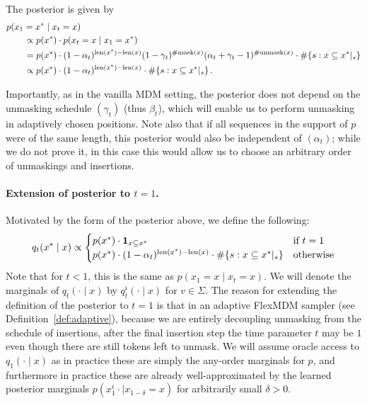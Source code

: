 The posterior is given by
\begin{align*}
    \MoveEqLeft p(x_1 = x^*\mid x_t = x) \\
    &\propto p(x^*) \cdot p(x_t = x \mid x_1 = x^*) \\
    &= p(x^*) \cdot (1 - \alpha_t)^{\length{x^*} - \length{x}} (1 - \gamma_t)^{\#\mathrm{mask}(x)} (\alpha_t + \gamma_t - 1)^{\#\mathrm{unmask}(x)} \cdot \#\{s: x \subseteq x^*|_s\} \\
    &\propto p(x^*) \cdot (1 - \alpha_t)^{\length{x^*}-\length{x}} \cdot \#\{s: x\subseteq x^*|_s\}\,. \label{eq:posterior}
\end{align*}

Importantly, as in the vanilla MDM setting, the posterior does not depend on the unmasking schedule $(\gamma_t)$ (thus $\beta_t$), which will enable us to perform unmasking in adaptively chosen positions. Note also that if all sequences in the support of $p$ were of the same length, this posterior would also be independent of $(\alpha_t)$; while we do not prove it, in this case this would allow us to choose an arbitrary order of unmaskings and insertions.

\paragraph{Extension of posterior to $t = 1$.}

Motivated by the form of the posterior above, we define the following:
\begin{equation}
    q_t(x^* \mid x) \propto \begin{cases}
        p(x^*) \cdot \mathbf{1}_{x\subseteq x^*} & \text{if} \ t = 1 \\
        p(x^*) \cdot (1 - \alpha_t)^{\mathrm{len}(x^*) - \mathrm{len}(x)}\cdot \#\{s: x\subseteq x^*|_s\} & \text{otherwise} 
    \end{cases}
\end{equation}
Note that for $t < 1$, this is the same as $p(x_1 = x \mid x_t = x)$. We will denote the marginals of $q_t(\cdot \mid x)$ by $q^i_t(\cdot \mid x)$ for $v\in \Sigma$. The reason for extending the definition of the posterior to $t = 1$ is that in an adaptive FlexMDM sampler (see Definition~\ref{def:adaptive}), because we are entirely decoupling unmasking from the schedule of insertions, after the final insertion step the time parameter $t$ may be $1$ even though there are still tokens left to unmask. We will assume oracle access to $q_1(\cdot \mid x)$ as in practice these are simply the any-order marginals for $p$, and furthermore in practice these are already well-approximated by the learned posterior marginals $p(x^i_1\cdot \mid x_{1 - \delta} = x)$ for arbitrarily small $\delta > 0$.


